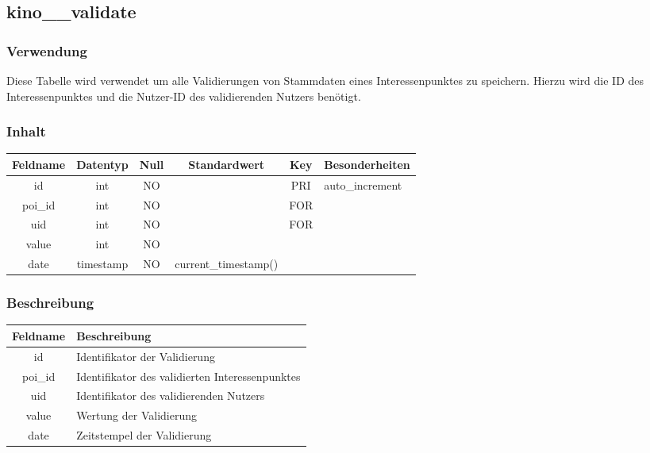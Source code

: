 \subsection{kino\_\_validate}
\subsubsection{Verwendung}  Diese Tabelle wird verwendet um alle Validierungen von Stammdaten eines Interessenpunktes zu speichern. Hierzu wird die ID des Interessenpunktes und die Nutzer-ID des validierenden Nutzers benötigt.
\subsubsection{Inhalt}
\begin{table}[H]
	\begin{tabular}{|c|c|c|c|c|p{3.5cm}|}
		\hline
		\textbf{Feldname} & \textbf{Datentyp} & \textbf{Null} & \textbf{Standardwert} & \textbf{Key}   & \textbf{Besonderheiten} \\ \hline
		id & int & NO &  & PRI & auto\_increment \\ \hline
		poi\_id & int & NO &  & FOR & \\ \hline
		uid & int & NO &  & FOR & \\ \hline
		value & int & NO &  &  & \\ \hline
		date & timestamp & NO & current\_timestamp() &  & \\ \hline
	\end{tabular}
\end{table}
\subsubsection{Beschreibung}
\begin{table}[H]
	\begin{tabular}{|c|p{12cm}|}
		\hline
		\textbf{Feldname} & \textbf{Beschreibung} \\ \hline
		id & Identifikator der Validierung \\ \hline
		poi\_id & Identifikator des validierten Interessenpunktes \\ \hline
		uid & Identifikator des validierenden Nutzers \\ \hline
		value & Wertung der Validierung \\ \hline
		date & Zeitstempel der Validierung \\ \hline
	\end{tabular}
\end{table}
